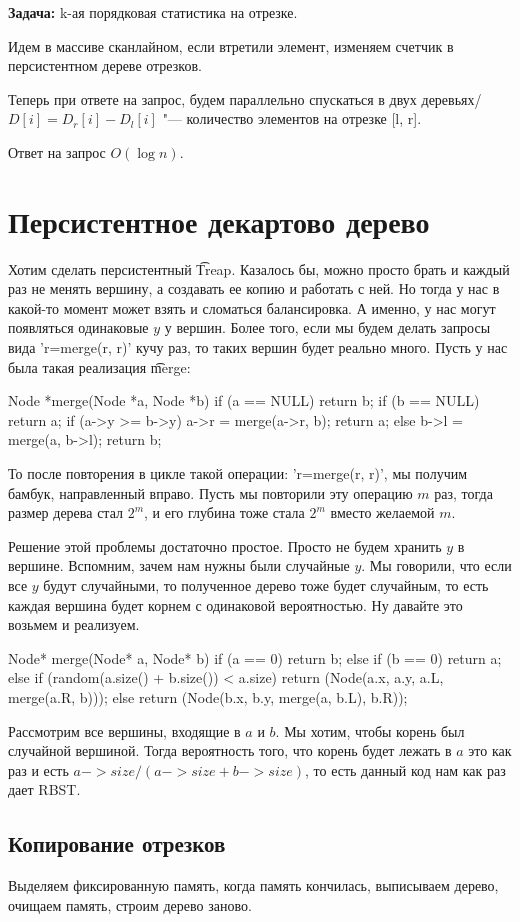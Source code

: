 \textbf{Задача:} k-ая порядковая статистика на отрезке.

Идем в массиве сканлайном, если втретили элемент, изменяем счетчик в персистентном 
дереве отрезков.

Теперь при ответе на запрос, будем параллельно спускаться в двух деревьях/ 
$D[i] = D_r[i] - D_l[i]$  "--- количество элементов на отрезке [l, r].

Ответ на запрос $O(\log n)$.

\section{Персистентное декартово дерево}
Хотим сделать персистентный \t{Treap}. Казалось бы, можно просто брать и каждый раз не менять вершину, а 
создавать ее копию и работать с ней. Но тогда у нас в какой-то момент может взять и сломаться балансировка.
А именно, у нас могут появляться одинаковые $y$ у вершин. 
Более того, если мы будем делать запросы вида \cpp'r=merge(r, r)' кучу раз, то таких вершин будет реально много.
Пусть у нас была такая реализация \t{merge}:
\begin{cppcode}
Node *merge(Node *a, Node *b){
    if (a == NULL) return b;
    if (b == NULL) return a;
    if (a->y >= b->y) {
        a->r = merge(a->r, b);
        return a;
    } else {
        b->l = merge(a, b->l);
        return b;
    }
}   
\end{cppcode}
То после повторения в цикле такой операции: \cpp'r=merge(r, r)', мы получим бамбук, направленный вправо.
Пусть мы повторили эту операцию $m$ раз, тогда размер дерева стал $2^m$, и его глубина тоже стала $2^m$ 
вместо желаемой $m$.

Решение этой проблемы достаточно простое. Просто не будем хранить $y$ в вершине. 
Вспомним, зачем нам нужны были случайные $y$. 
Мы говорили, что если все $y$ будут случайными, то полученное дерево тоже будет случайным, то есть каждая вершина
будет корнем с одинаковой вероятностью. 
Ну давайте это возьмем и реализуем.

\begin{cppcode}
Node* merge(Node* a, Node* b) {
    if (a == 0) return b;
    else if (b == 0) return a;
    else if (random(a.size() + b.size()) < a.size) {
        return (Node(a.x, a.y, a.L, merge(a.R, b)));
    } else {
        return (Node(b.x, b.y, merge(a, b.L), b.R));
    }
}
\end{cppcode}

Рассмотрим все вершины, входящие в $a$ и $b$. 
Мы хотим, чтобы корень был случайной вершиной. 
Тогда вероятность того, что корень будет лежать в $a$ это как раз и есть $a->size / (a->size + b->size)$, то есть данный
код нам как раз дает RBST.

\subsection{Копирование отрезков}
Выделяем фиксированную память, когда память кончилась, выписываем дерево, очищаем память, 
строим дерево заново.